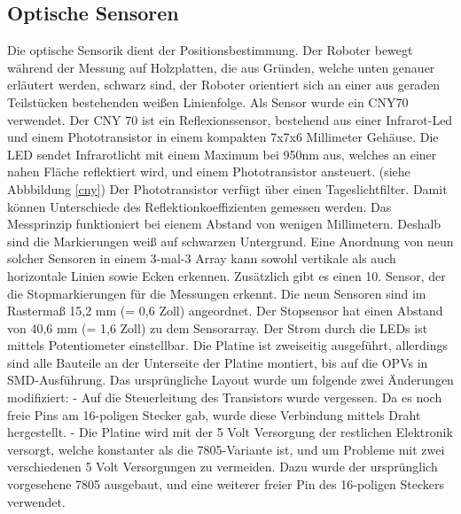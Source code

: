 \documentclass[a4paper,bibtotoc,oneside]{scrbook}
\begin{document}
\subsection{Optische Sensoren}\thispagestyle{empty}
Die optische Sensorik dient der Positionsbestimmung. Der Roboter bewegt während der Messung auf Holzplatten, die aus Gründen, welche unten genauer erläutert werden, schwarz sind, der Roboter orientiert sich an einer aus geraden Teilstücken bestehenden weißen Linienfolge. 
Als Sensor wurde ein CNY70 \cite{cny} verwendet. Der CNY 70 ist ein Reflexionssensor, bestehend aus einer Infrarot-Led und einem Phototransistor in einem kompakten 7x7x6 Millimeter Gehäuse. Die LED sendet Infrarotlicht mit einem Maximum bei 950nm aus, welches an einer nahen Fläche reflektiert wird, und einem Phototransistor ansteuert. (siehe Abbbildung \ref{cny}) Der Phototransistor verfügt über einen Tageslichtfilter. Damit können Unterschiede des Reflektionkoeffizienten gemessen werden. Das Messprinzip funktioniert bei eienem Abstand von wenigen Millimetern.  Deshalb sind die Markierungen weiß auf schwarzen Untergrund. Eine Anordnung von neun solcher Sensoren in einem 3-mal-3 Array kann sowohl vertikale als auch horizontale Linien sowie Ecken erkennen. Zusätzlich gibt es einen 10. Sensor, der die Stopmarkierungen für die Messungen erkennt.
Die neun Sensoren sind im Rastermaß 15,2 mm (= 0,6 Zoll) angeordnet. Der Stopsensor hat einen Abstand von 40,6 mm (= 1,6 Zoll) zu dem Sensorarray. 
Der Strom durch die LEDs ist mittels Potentiometer einstellbar. 
Die Platine ist zweiseitig ausgeführt, allerdings sind alle Bauteile an der Unterseite der Platine montiert, bis auf die OPVs in SMD-Ausführung. Das ursprüngliche Layout wurde um folgende zwei Änderungen modifiziert:
- Auf die Steuerleitung des Transistors wurde vergessen. Da es noch freie Pins am 16-poligen Stecker gab, wurde diese Verbindung mittels Draht hergestellt.
- Die Platine wird mit der 5 Volt Versorgung der restlichen Elektronik versorgt, welche konstanter als die 7805-Variante ist, und um Probleme mit zwei verschiedenen 5 Volt Versorgungen zu vermeiden. Dazu wurde der ursprünglich vorgesehene 7805 ausgebaut, und eine weiterer freier Pin des 16-poligen Steckers verwendet.
\end{document}
